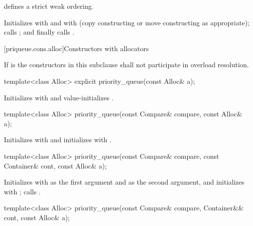 \begin{itemdescr}
\pnum
\expects
{} defines a strict weak ordering.

\pnum
\effects
Initializes
 with
 and
 with
 (copy constructing or move constructing as appropriate);
calls
;
and finally calls
.
\end{itemdescr}

[priqueue.cons.alloc]{Constructors with allocators}

\pnum
If  is 
the constructors in this subclause shall not participate in overload resolution.

%
\begin{itemdecl}
template<class Alloc> explicit priority_queue(const Alloc& a);
\end{itemdecl}

\begin{itemdescr}
\pnum
\effects
Initializes  with  and value-initializes .
\end{itemdescr}

%
\begin{itemdecl}
template<class Alloc> priority_queue(const Compare& compare, const Alloc& a);
\end{itemdecl}

\begin{itemdescr}
\pnum
\effects
Initializes  with  and initializes  with .
\end{itemdescr}

%
\begin{itemdecl}
template<class Alloc>
  priority_queue(const Compare& compare, const Container& cont, const Alloc& a);
\end{itemdecl}

\begin{itemdescr}
\pnum
\effects
Initializes  with  as the first argument and  as the second
argument, and initializes  with ;
calls .
\end{itemdescr}

%
\begin{itemdecl}
template<class Alloc>
  priority_queue(const Compare& compare, Container&& cont, const Alloc& a);
\end{itemdecl}

